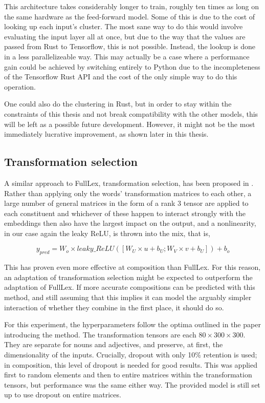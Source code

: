 \documentclass[a4paper, 12pt]{article}
\begin{document}
This architecture takes considerably longer to train, roughly ten times as long on the same hardware as the feed-forward model. Some of this is due to the cost of looking up each input's cluster. The most sane way to do this would involve evaluating the input layer all at once, but due to the way that the values are passed from Rust to Tensorflow, this is not possible. Instead, the lookup is done in a less parallelizeable way. This may actually be a case where a performance gain could be achieved by switching entirely to Python due to the incompleteness of the Tensorflow Rust API and the cost of the only simple way to do this operation.

One could also do the clustering in Rust, but in order to stay within the constraints of this thesis and not break compatibility with the other models, this will be left as a possible future development. However, it might not be the most immediately lucrative improvement, as shown later in this thesis.

\subsection{Transformation selection}
A similar approach to FullLex, transformation selection, has been proposed in \cite{TSelect}. Rather than applying only the words' transformation matrices to each other, a large number of general matrices in the form of a rank 3 tensor are applied to each constituent and whichever of these happen to interact strongly with the embeddings then also have the largest impact on the output, and a nonlinearity, in our case again the leaky ReLU, is thrown into the mix, that is,

\begin{equation} \label{eq:6}
	y_{pred} = W_o \times leaky\_ReLU([W_U \times u + b_U; W_V \times v + b_U]) + b_o
\end{equation}

This has proven even more effective at composition than FullLex. For this reason, an adaptation of transformation selection might be expected to outperform the adaptation of FullLex. If more accurate compositions can be predicted with this method, and still assuming that this implies it can model the arguably simpler interaction of whether they combine in the first place, it should do so.

For this experiment, the hyperparameters follow the optima outlined in the paper introducing the method. The transformation tensors are each $ 80 \times 300 \times 300 $. They are separate for nouns and adjectives, and preserve, at first, the dimensionality of the inputs. Crucially, dropout with only 10\% retention is used; in composition, this level of dropout is needed for good results. This was applied first to random elements and then to entire matrices within the transformation tensors, but performance was the same either way. The provided model is still set up to use dropout on entire matrices.
\end{document}
